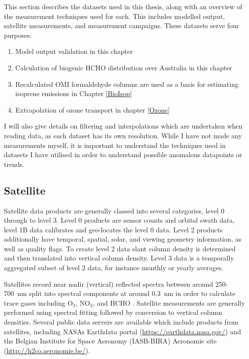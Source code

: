   This section describes the datasets used in this thesis, along with an overview of the measurement techniques used for each.
  This includes modelled output, satellite measurements, and measurement campaigns.
  These datasets serve four purposes: 
  \begin{enumerate}
    \item Model output validation in this chapter
    \item Calculation of biogenic HCHO distribution over Australia in this chapter
    \item Recalculated OMI formaldehyde columns are used as a basis for estimating isoprene emissions in Chapter \ref{BioIsop}
    \item Extrapolation of ozone transport in chapter \ref{Ozone}
  \end{enumerate}
  I will also give details on filtering and interpolations which are undertaken when reading data, as each dataset has its own resolution.
  While I have not made any measurements myself, it is important to understand the techniques used in datasets I have utilised in order to understand possible anomalous datapoints or trends.
  
  \subsection{Satellite}
  \label{Model:Datasets:satellite}
    Satellite data products are generally classed into several categories, level 0 through to level 3. Level 0 products are sensor counts and orbital swath data, level 1B data calibrates and geo-locates the level 0 data. 
    Level 2 products additionally have temporal, spatial, solar, and viewing geometry information, as well as quality flags.
    To create level 2 data slant column density is determined and then translated into vertical column density. 
    Level 3 data is a temporally aggregated subset of level 2 data, for instance monthly or yearly averages.
    
    Satellites record near nadir (vertical) reflected spectra between around 250-700~nm split into spectral components at around $0.3$~nm in order to calculate trace gases including O$_3$, NO$_2$, and HCHO \parencite[eg.][]{Leue2001}.
    Satellite measurements are generally performed using spectral fitting followed by conversion to vertical column densities.
    Several public data servers are available which include products from satellites, including NASAs Earthdata portal (\url{https://earthdata.nasa.gov/}) and the Belgian Institute for Space Aeronomy (IASB-BIRA) Aeronomie site (\url{http://h2co.aeronomie.be/}).
    
